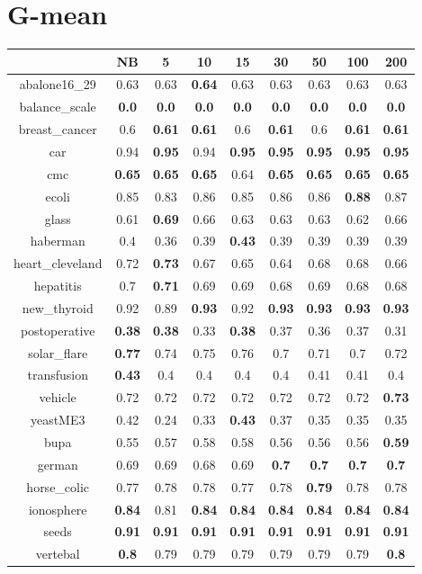 \documentclass{article}%
\begin{document}
%
\section*{G{-}mean}%
\begin{tabular}{c|cccccccc}%
\hline%
&NB&5&10&15&30&50&100&200\\%
\hline%
abalone16\_29&0.63&0.63&\textbf{0.64}&0.63&0.63&0.63&0.63&0.63\\%
\hline%
balance\_scale&\textbf{0.0}&\textbf{0.0}&\textbf{0.0}&\textbf{0.0}&\textbf{0.0}&\textbf{0.0}&\textbf{0.0}&\textbf{0.0}\\%
\hline%
breast\_cancer&0.6&\textbf{0.61}&\textbf{0.61}&0.6&\textbf{0.61}&0.6&\textbf{0.61}&\textbf{0.61}\\%
\hline%
car&0.94&\textbf{0.95}&0.94&\textbf{0.95}&\textbf{0.95}&\textbf{0.95}&\textbf{0.95}&\textbf{0.95}\\%
\hline%
cmc&\textbf{0.65}&\textbf{0.65}&\textbf{0.65}&0.64&\textbf{0.65}&\textbf{0.65}&\textbf{0.65}&\textbf{0.65}\\%
\hline%
ecoli&0.85&0.83&0.86&0.85&0.86&0.86&\textbf{0.88}&0.87\\%
\hline%
glass&0.61&\textbf{0.69}&0.66&0.63&0.63&0.63&0.62&0.66\\%
\hline%
haberman&0.4&0.36&0.39&\textbf{0.43}&0.39&0.39&0.39&0.39\\%
\hline%
heart\_cleveland&0.72&\textbf{0.73}&0.67&0.65&0.64&0.68&0.68&0.66\\%
\hline%
hepatitis&0.7&\textbf{0.71}&0.69&0.69&0.68&0.69&0.68&0.68\\%
\hline%
new\_thyroid&0.92&0.89&\textbf{0.93}&0.92&\textbf{0.93}&\textbf{0.93}&\textbf{0.93}&\textbf{0.93}\\%
\hline%
postoperative&\textbf{0.38}&\textbf{0.38}&0.33&\textbf{0.38}&0.37&0.36&0.37&0.31\\%
\hline%
solar\_flare&\textbf{0.77}&0.74&0.75&0.76&0.7&0.71&0.7&0.72\\%
\hline%
transfusion&\textbf{0.43}&0.4&0.4&0.4&0.4&0.41&0.41&0.4\\%
\hline%
vehicle&0.72&0.72&0.72&0.72&0.72&0.72&0.72&\textbf{0.73}\\%
\hline%
yeastME3&0.42&0.24&0.33&\textbf{0.43}&0.37&0.35&0.35&0.35\\%
\hline%
bupa&0.55&0.57&0.58&0.58&0.56&0.56&0.56&\textbf{0.59}\\%
\hline%
german&0.69&0.69&0.68&0.69&\textbf{0.7}&\textbf{0.7}&\textbf{0.7}&\textbf{0.7}\\%
\hline%
horse\_colic&0.77&0.78&0.78&0.77&0.78&\textbf{0.79}&0.78&0.78\\%
\hline%
ionosphere&\textbf{0.84}&0.81&\textbf{0.84}&\textbf{0.84}&\textbf{0.84}&\textbf{0.84}&\textbf{0.84}&\textbf{0.84}\\%
\hline%
seeds&\textbf{0.91}&\textbf{0.91}&\textbf{0.91}&\textbf{0.91}&\textbf{0.91}&\textbf{0.91}&\textbf{0.91}&\textbf{0.91}\\%
\hline%
vertebal&\textbf{0.8}&0.79&0.79&0.79&0.79&0.79&0.79&\textbf{0.8}\\%
\hline%
\end{tabular}

%
\end{document}
